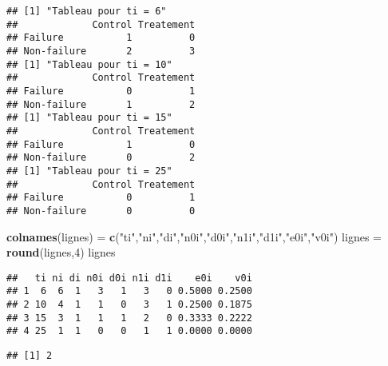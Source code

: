 \documentclass[
]{article}
\newenvironment{Shaded}{\begin{snugshade}}{\end{snugshade}}
\newcommand{\DecValTok}[1]{\textcolor[rgb]{0.00,0.00,0.81}{#1}}
\newcommand{\KeywordTok}[1]{\textcolor[rgb]{0.13,0.29,0.53}{\textbf{#1}}}
\newcommand{\NormalTok}[1]{#1}
\newcommand{\OperatorTok}[1]{\textcolor[rgb]{0.81,0.36,0.00}{\textbf{#1}}}
\newcommand{\StringTok}[1]{\textcolor[rgb]{0.31,0.60,0.02}{#1}}
\begin{document}
\begin{verbatim}
## [1] "Tableau pour ti = 6"
##             Control Treatement
## Failure           1          0
## Non-failure       2          3
## [1] "Tableau pour ti = 10"
##             Control Treatement
## Failure           0          1
## Non-failure       1          2
## [1] "Tableau pour ti = 15"
##             Control Treatement
## Failure           1          0
## Non-failure       0          2
## [1] "Tableau pour ti = 25"
##             Control Treatement
## Failure           0          1
## Non-failure       0          0
\end{verbatim}

\begin{Shaded}
\begin{Highlighting}[]
\KeywordTok{colnames}\NormalTok{(lignes) =}\StringTok{ }\KeywordTok{c}\NormalTok{(}\StringTok{"ti"}\NormalTok{,}\StringTok{"ni"}\NormalTok{,}\StringTok{"di"}\NormalTok{,}\StringTok{"n0i"}\NormalTok{,}\StringTok{"d0i"}\NormalTok{,}\StringTok{"n1i"}\NormalTok{,}\StringTok{"d1i"}\NormalTok{,}\StringTok{"e0i"}\NormalTok{,}\StringTok{"v0i"}\NormalTok{)}
\NormalTok{lignes =}\StringTok{ }\KeywordTok{round}\NormalTok{(lignes,}\DecValTok{4}\NormalTok{)}
\NormalTok{lignes}
\end{Highlighting}
\end{Shaded}

\begin{verbatim}
##   ti ni di n0i d0i n1i d1i    e0i    v0i
## 1  6  6  1   3   1   3   0 0.5000 0.2500
## 2 10  4  1   1   0   3   1 0.2500 0.1875
## 3 15  3  1   1   1   2   0 0.3333 0.2222
## 4 25  1  1   0   0   1   1 0.0000 0.0000
\end{verbatim}

\begin{Shaded}
\end{Shaded}

\begin{verbatim}
## [1] 2
\end{verbatim}

\begin{Shaded}
\end{Shaded}
\end{document}
